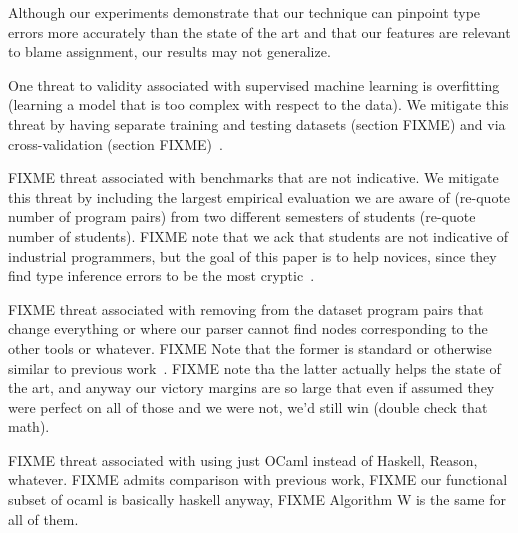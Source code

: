 Although our experiments demonstrate that our technique can pinpoint type
errors more accurately than the state of the art and that our features are
relevant to blame assignment, our results may not generalize. 

One threat to validity associated with supervised machine learning is
overfitting (\ie learning a model that is too complex with respect to the
data). We mitigate this threat by having separate training and testing
datasets (section FIXME) and via cross-validation (section
FIXME)~\cite{FIXME}. 

FIXME threat associated with benchmarks that are not indicative. We
mitigate this threat by including the largest empirical evaluation we are
aware of (re-quote number of program pairs) from two different semesters of
students (re-quote number of students). FIXME note that we ack that
students are not indicative of industrial programmers, but the goal of this
paper is to help novices, since they find type inference errors to be the
most cryptic~\cite{FIXME}. 

FIXME threat associated with removing from the dataset program pairs
that change everything or where our parser cannot find nodes corresponding
to the other tools or whatever. FIXME Note that the former is
standard or otherwise similar to previous work~\cite{FIXME}. FIXME note tha
the latter actually helps the state of the art, and anyway our victory
margins are so large that even if assumed they were perfect on all of those
and we were not, we'd still win (double check that math). 

FIXME threat associated with using just OCaml instead of Haskell, Reason,
whatever. FIXME admits comparison with previous work, FIXME our functional
subset of ocaml is basically haskell anyway, FIXME Algorithm W is the same
for all of them.


